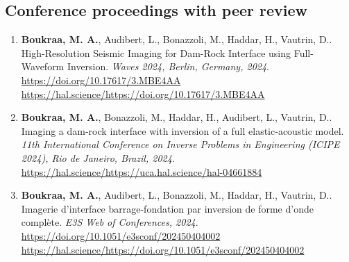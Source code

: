 \documentclass[10pt]{article} %
\begin{document}
\subsection{Conference proceedings with peer review}
\begin{enumerate}
\item \textbf{Boukraa, M. A.}, Audibert, L., Bonazzoli, M., Haddar, H., Vautrin, D.. High-Resolution Seismic Imaging for Dam-Rock Interface using Full-Waveform Inversion. \textit{Waves 2024, Berlin, Germany, 2024}. \url{https://doi.org/10.17617/3.MBE4AA} \url{https://hal.science/https://doi.org/10.17617/3.MBE4AA}
\item \textbf{Boukraa, M. A.}, Bonazzoli, M., Haddar, H., Audibert, L., Vautrin, D.. Imaging a dam-rock interface with inversion of a full elastic-acoustic model. \textit{11th International Conference on Inverse Problems in Engineering (ICIPE 2024), Rio de Janeiro, Brazil, 2024}. \url{https://hal.science/https://uca.hal.science/hal-04661884}
\item \textbf{Boukraa, M. A.}, Audibert, L., Bonazzoli, M., Haddar, H., Vautrin, D.. Imagerie d’interface barrage-fondation par inversion de forme d’onde complète. \textit{E3S Web of Conferences, 2024}. \url{https://doi.org/10.1051/e3sconf/202450404002} \url{https://hal.science/https://doi.org/10.1051/e3sconf/202450404002}
\end{enumerate}




\end{document}
